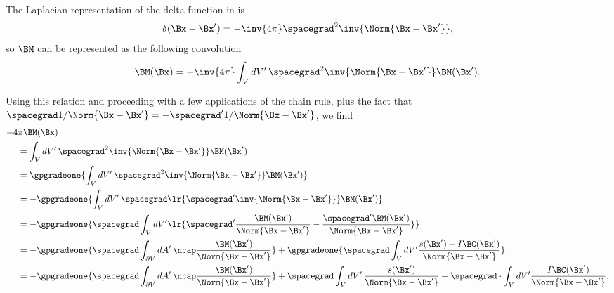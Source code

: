 The Laplacian representation of the delta function in  is
\begin{equation}\label{eqn:helmholtzDerviationMultivectorSolution:100}
\delta(\Bx - \Bx') = -\inv{4\pi} \spacegrad^2 \inv{\Norm{\Bx - \Bx'}},
\end{equation}
so \( \BM \) can be represented as the following convolution
\begin{equation}\label{eqn:helmholtzDerviationMultivectorSolution:120}
\BM(\Bx) = -\inv{4\pi} \int_V dV'\, \spacegrad^2 \inv{\Norm{\Bx - \Bx'}} \BM(\Bx').
\end{equation}

%
%

Using this relation and proceeding with a few applications of the chain rule, plus the fact that \( \spacegrad 1/\Norm{\Bx - \Bx'} = -\spacegrad' 1/\Norm{\Bx - \Bx'} \), we find
%
%
%
\begin{equation}\label{eqn:helmholtzDerviationMultivectorSolution:720}
\begin{aligned}
-4 &\pi \BM(\Bx) \\
&= \int_V dV'\, \spacegrad^2 \inv{\Norm{\Bx - \Bx'}} \BM(\Bx') \\
&= \gpgradeone{\int_V dV'\, \spacegrad^2 \inv{\Norm{\Bx - \Bx'}} \BM(\Bx')} \\
&= -\gpgradeone{\int_V dV'\, \spacegrad \lr{ \spacegrad' \inv{\Norm{\Bx - \Bx'}}} \BM(\Bx')} \\
&= -\gpgradeone{\spacegrad \int_V dV' \lr{
   \spacegrad' \frac{\BM(\Bx')}{\Norm{\Bx - \Bx'}}
   -\frac{\spacegrad' \BM(\Bx')}{\Norm{\Bx - \Bx'}}
   } } \\
&= -\gpgradeone{\spacegrad \int_{\partial V} dA'\,
   \ncap \frac{\BM(\Bx')}{\Norm{\Bx - \Bx'}}
    }
   +\gpgradeone{\spacegrad \int_V dV'
   \frac{s(\Bx') + I\BC(\Bx')}{\Norm{\Bx - \Bx'}}
    } \\
&= -\gpgradeone{\spacegrad \int_{\partial V} dA'\,
   \ncap \frac{\BM(\Bx')}{\Norm{\Bx - \Bx'}}
    }
   +\spacegrad \int_V dV'\,
   \frac{s(\Bx')}{\Norm{\Bx - \Bx'}}
   +\spacegrad \cdot \int_V dV'
   \frac{I\BC(\Bx')}{\Norm{\Bx - \Bx'}}.
\end{aligned}
\end{equation}

